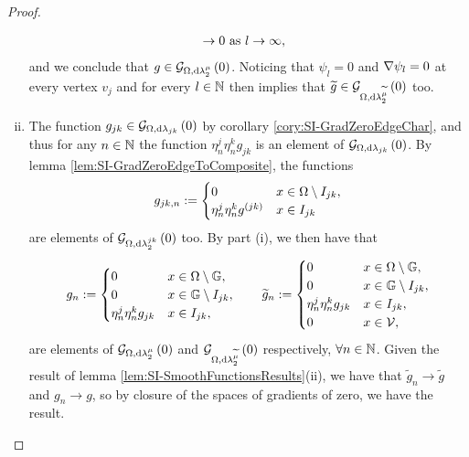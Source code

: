 \begin{proof}
\begin{enumerate}[(i)]
\begin{align*}
			&\rightarrow 0 \ \text{as} \ l \rightarrow\infty,
		\end{align*}
		and we conclude that $g\in\mathcal{G}_{ \Omega, \mathrm{d}\lambda_2^{\mu}}\left( 0 \right)$.
		Noticing that $\psi_l=0$ and $\nabla\psi_l=0$ at every vertex $v_j$ and for every $l\in\mathbb{N}$ then implies that $\widetilde{g}\in\mathcal{G}_{ \Omega, \mathrm{d}\lambda_2^{\widetilde{\mu}}}\left( 0 \right)$ too.
		\item The function $g_{jk}\in\mathcal{G}_{ \Omega, \mathrm{d}\lambda_{jk}}\left( 0 \right)$ by corollary \ref{cory:SI-GradZeroEdgeChar}, and thus for any $n\in\mathbb{N}$ the function $\eta_n^j\eta_n^k g_{jk}$ is an element of $\mathcal{G}_{ \Omega, \mathrm{d}\lambda_{jk}}\left( 0 \right)$.
		By lemma \ref{lem:SI-GradZeroEdgeToComposite}, the functions
		\begin{align*}
			g_{jk,n} := \begin{cases} 0 & x\in\Omega\setminus I_{jk}, \\ \eta_n^j\eta_n^k g^{(jk)} & x\in I_{jk} \end{cases}
		\end{align*}
		are elements of $\mathcal{G}_{ \Omega, \mathrm{d}\lambda_2^{jk}}\left( 0 \right)$ too.
		By part (i), we then have that
		\begin{align*}
			g_n := 	\begin{cases} 0 & x\in\Omega\setminus\mathbb{G}, \\ 0 & x\in\mathbb{G}\setminus I_{jk}, \\ \eta_n^j\eta_n^k g_{jk} & x\in I_{jk}, \end{cases}
			\qquad
			\widetilde{g}_n := 	\begin{cases} 0 & x\in\Omega\setminus\mathbb{G}, \\ 0 & x\in\mathbb{G}\setminus I_{jk}, \\ \eta_n^j\eta_n^k g_{jk} & x\in I_{jk}, \\ 0 & x\in\mathcal{V}, \end{cases}
		\end{align*}
		are elements of $\mathcal{G}_{ \Omega, \mathrm{d}\lambda_2^{\mu}}\left( 0 \right)$ and $\mathcal{G}_{ \Omega, \mathrm{d}\lambda_2^{\widetilde{\mu}}}\left( 0 \right)$ respectively, $\forall n\in\mathbb{N}$.
		Given the result of lemma \ref{lem:SI-SmoothFunctionsResults}(ii), we have that $\widetilde{g}_n\rightarrow\widetilde{g}$ and $g_n\rightarrow g$, so by closure of the spaces of gradients of zero, we have the result.

\end{enumerate}
\end{proof}
